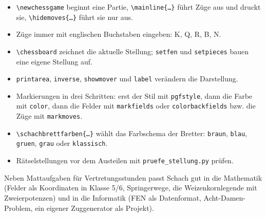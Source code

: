 \begin{itemize}
	\item \texttt{\textbackslash newchessgame} beginnt eine Partie, \texttt{\textbackslash mainline\{\dots\}} führt Züge aus und druckt sie, \texttt{\textbackslash hidemoves\{\dots\}} führt sie nur aus.
	\item Züge immer mit englischen Buchstaben eingeben: K, Q, R, B, N.
	\item \texttt{\textbackslash chessboard} zeichnet die aktuelle Stellung; \texttt{setfen} und \texttt{setpieces} bauen eine eigene Stellung auf.
	\item \texttt{printarea}, \texttt{inverse}, \texttt{showmover} und \texttt{label} verändern die Darstellung.
	\item Markierungen in drei Schritten: erst der Stil mit \texttt{pgfstyle}, dann die Farbe mit \texttt{color}, dann die Felder mit \texttt{markfields} oder \texttt{colorbackfields} bzw. die Züge mit \texttt{markmoves}.
	\item \texttt{\textbackslash schachbrettfarben\{\dots\}} wählt das Farbschema der Bretter: \texttt{braun}, \texttt{blau}, \texttt{gruen}, \texttt{grau} oder \texttt{klassisch}.
	\item Rätselstellungen vor dem Austeilen mit \texttt{pruefe\_stellung.py} prüfen.
\end{itemize}

Neben Mattaufgaben für Vertretungsstunden passt Schach gut in die Mathematik (Felder als Koordinaten in Klasse 5/6, Springerwege, die Weizenkornlegende mit Zweierpotenzen) und in die Informatik (FEN als Datenformat, Acht-Damen-Problem, ein eigener Zuggenerator als Projekt).


